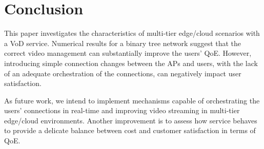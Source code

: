 \section{Conclusion}
\label{sec:conclusion}


This paper investigates the characteristics of multi-tier edge/cloud scenarios with a VoD service. Numerical results for a binary tree network suggest that the correct video management can substantially improve the users' QoE. However, introducing simple connection changes between the APs and users, with the lack of an adequate orchestration of the connections, can negatively impact user satisfaction.

As future work, we intend to implement mechanisms capable of orchestrating the users' connections in real-time and improving video streaming in multi-tier edge/cloud environments.
Another improvement is to assess how service behaves to provide a delicate balance between cost and customer satisfaction in terms of QoE.

